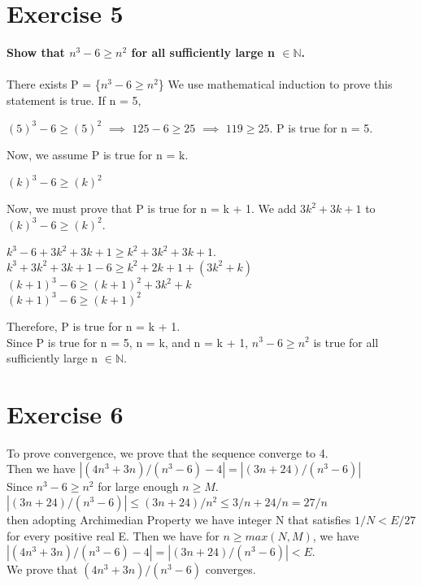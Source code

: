 \documentclass[12pt]{article}
\theoremstyle{definition}
\numberwithin{equation}{subsection}
\begin{document}
\section{Exercise 5}
\textbf{Show that $n^3 - 6 \geq n^2$ for all sufficiently large n $\in \mathbb{N}$.}
\\
\\
There exists P = \{$n^3 - 6 \geq n^2$\}
We use mathematical induction to prove this statement is true.
If n = 5,
\begin{center}
    $(5)^3 - 6 \geq (5)^2$ $\implies$ $125 - 6 \geq 25$ $\implies$ $ 119 \geq 25. $ P is true for n = 5.
\end{center}
Now, we assume P is true for n = k.
\begin{center}
    $(k)^3 - 6 \geq (k)^2$ 
\end{center}
Now, we must prove that P is true for n = k + 1. We add $3k^2+3k+1$ to $(k)^3 - 6 \geq (k)^2$.
\begin{center}
    $k^3 - 6 + 3k^2+3k+1 \geq k^2 + 3k^2+3k+1$.
    \\
    $k^3+3k^2+3k+1-6 \geq k^2 + 2k+1+(3k^2+k)$
    \\
    $(k+1)^3-6 \geq (k+1)^2 + 3k^2+k$
    \\
    $(k+1)^3-6 \geq (k+1)^2$
\end{center}
Therefore, P is true for n = k + 1. 
\\
Since P is true for n = 5, n = k, and n = k + 1, $n^3 - 6 \geq n^2$ is true for all sufficiently large n $\in \mathbb{N}$.
\section{Exercise 6}
To prove convergence, we prove that the sequence converge to 4. 
\\Then we have $|(4n^3+3n)/(n^3-6)-4|=|(3n+24)/(n^3-6)|$
\\Since $n^3 - 6 \geq n^2$ for large enough $n \geq M$.
\\$|(3n+24)/(n^3-6)| \leqslant (3n+24)/n^2 \leqslant 3/n+24/n = 27/n $
\\ then adopting Archimedian Property we have integer N that satisfies $1/N < E/27 $ for every positive real E. Then we have for $n \geq max(N,M)$, we have $|(4n^3+3n)/(n^3-6)-4|=|(3n+24)/(n^3-6)| < E$.
\\We prove that $(4n^3+3n)/(n^3-6)$ converges.   
\end{document}
